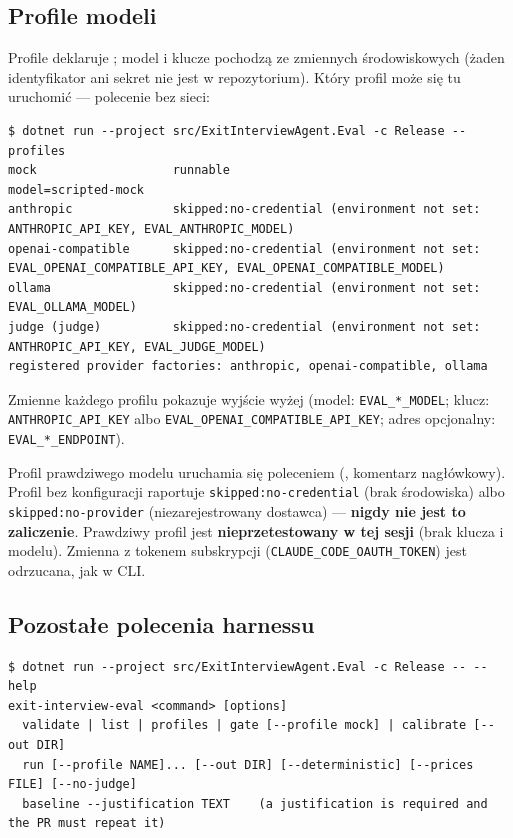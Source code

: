 {\subsection{Profile modeli}

Profile deklaruje ; model i klucze pochodzą ze
zmiennych środowiskowych (żaden identyfikator ani sekret nie jest w repozytorium).
Który profil może się tu uruchomić --- polecenie bez sieci:

\begin{Verbatim}[fontsize=\scriptsize,frame=single,framesep=2mm]
$ dotnet run --project src/ExitInterviewAgent.Eval -c Release -- profiles
mock                   runnable                         model=scripted-mock
anthropic              skipped:no-credential (environment not set: ANTHROPIC_API_KEY, EVAL_ANTHROPIC_MODEL)
openai-compatible      skipped:no-credential (environment not set: EVAL_OPENAI_COMPATIBLE_API_KEY, EVAL_OPENAI_COMPATIBLE_MODEL)
ollama                 skipped:no-credential (environment not set: EVAL_OLLAMA_MODEL)
judge (judge)          skipped:no-credential (environment not set: ANTHROPIC_API_KEY, EVAL_JUDGE_MODEL)
registered provider factories: anthropic, openai-compatible, ollama
\end{Verbatim}

Zmienne każdego profilu pokazuje wyjście wyżej (model: \texttt{EVAL\_*\_MODEL}; klucz: \texttt{ANTHROPIC\_API\_KEY} albo \texttt{EVAL\_OPENAI\_COMPATIBLE\_API\_KEY}; adres opcjonalny: \texttt{EVAL\_*\_ENDPOINT}).

Profil prawdziwego modelu uruchamia się poleceniem
(, komentarz nagłówkowy). Profil bez konfiguracji
raportuje \texttt{skipped:\allowbreak{}no-\allowbreak{}credential} (brak środowiska) albo
\texttt{skipped:\allowbreak{}no-\allowbreak{}provider} (niezarejestrowany dostawca) --- \textbf{nigdy nie
jest to zaliczenie}. Prawdziwy profil jest \textbf{nieprzetestowany w tej
sesji} (brak klucza i modelu). Zmienna z tokenem subskrypcji
(\texttt{CLAUDE\_\allowbreak{}CODE\_\allowbreak{}OAUTH\_\allowbreak{}TOKEN}) jest odrzucana, jak w CLI.

\subsection{Pozostałe polecenia harnessu}

\begin{Verbatim}[fontsize=\scriptsize,frame=single,framesep=2mm]
$ dotnet run --project src/ExitInterviewAgent.Eval -c Release -- --help
exit-interview-eval <command> [options]
  validate | list | profiles | gate [--profile mock] | calibrate [--out DIR]
  run [--profile NAME]... [--out DIR] [--deterministic] [--prices FILE] [--no-judge]
  baseline --justification TEXT    (a justification is required and the PR must repeat it)
\end{Verbatim}

}
